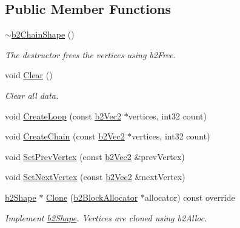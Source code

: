 \subsection*{Public Member Functions}
\begin{DoxyCompactItemize}
\item 
\mbox{\label{classb2ChainShape_a8c032394f5a85e7fc425a437e7689a18}} 
\mbox{\hyperlink{classb2ChainShape_a8c032394f5a85e7fc425a437e7689a18}{$\sim$b2\+Chain\+Shape}} ()
\begin{DoxyCompactList}\small\item\em The destructor frees the vertices using b2\+Free. \end{DoxyCompactList}\item 
\mbox{\label{classb2ChainShape_a434d4b61ab15726302ec5ad484011c33}} 
void \mbox{\hyperlink{classb2ChainShape_a434d4b61ab15726302ec5ad484011c33}{Clear}} ()
\begin{DoxyCompactList}\small\item\em Clear all data. \end{DoxyCompactList}\item 
void \mbox{\hyperlink{classb2ChainShape_ac257742a52cac391e25962a4c703fb06}{Create\+Loop}} (const \mbox{\hyperlink{structb2Vec2}{b2\+Vec2}} $\ast$vertices, int32 count)
\item 
void \mbox{\hyperlink{classb2ChainShape_aa0977339b743c05f2179939ccc38e7e0}{Create\+Chain}} (const \mbox{\hyperlink{structb2Vec2}{b2\+Vec2}} $\ast$vertices, int32 count)
\item 
void \mbox{\hyperlink{classb2ChainShape_aeb2ddbe0c52a98885e91b7c8f597315b}{Set\+Prev\+Vertex}} (const \mbox{\hyperlink{structb2Vec2}{b2\+Vec2}} \&prev\+Vertex)
\item 
void \mbox{\hyperlink{classb2ChainShape_a15c7c2821a52266ef57621ac7d34a95f}{Set\+Next\+Vertex}} (const \mbox{\hyperlink{structb2Vec2}{b2\+Vec2}} \&next\+Vertex)
\item 
\mbox{\label{classb2ChainShape_a03d2ea80168d29c553fa21b5a821e6d8}} 
\mbox{\hyperlink{classb2Shape}{b2\+Shape}} $\ast$ \mbox{\hyperlink{classb2ChainShape_a03d2ea80168d29c553fa21b5a821e6d8}{Clone}} (\mbox{\hyperlink{classb2BlockAllocator}{b2\+Block\+Allocator}} $\ast$allocator) const override
\begin{DoxyCompactList}\small\item\em Implement \mbox{\hyperlink{classb2Shape}{b2\+Shape}}. Vertices are cloned using b2\+Alloc. \end{DoxyCompactList}\item 

\end{DoxyCompactItemize}
